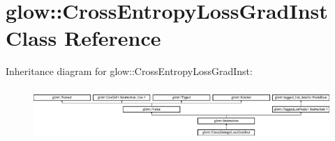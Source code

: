 \hypertarget{classglow_1_1_cross_entropy_loss_grad_inst}{}\section{glow\+:\+:Cross\+Entropy\+Loss\+Grad\+Inst Class Reference}
\label{classglow_1_1_cross_entropy_loss_grad_inst}
Inheritance diagram for glow\+:\+:Cross\+Entropy\+Loss\+Grad\+Inst\+:\begin{figure}[H]
\begin{center}
\leavevmode
\includegraphics[height=1.991111cm]{classglow_1_1_cross_entropy_loss_grad_inst}
\end{center}
\end{figure}
